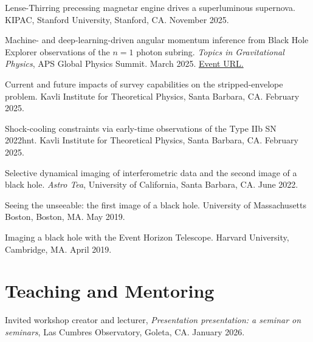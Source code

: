 \documentclass[margin,line]{res}
\begin{document}
\begin{resume}
\vspace*{-2mm}
Lense-Thirring precessing magnetar engine drives a superluminous supernova. KIPAC, Stanford University, Stanford, CA. November 2025.

\vspace*{-2mm}
Machine- and deep-learning-driven angular momentum inference from Black Hole Explorer observations of the $n=1$ photon subring. \textit{Topics in Gravitational Physics}, APS Global Physics Summit. March 2025. {\color{blue}\href{https://summit.aps.org/events/APR-C20/8}{Event URL.}}

\vspace*{-2mm}
Current and future impacts of survey capabilities on the stripped-envelope problem. Kavli Institute for Theoretical Physics, Santa Barbara, CA. February 2025.

\vspace*{-2mm}
Shock-cooling constraints via early-time observations of the Type IIb SN 2022hnt. Kavli Institute for Theoretical Physics, Santa Barbara, CA. February 2025.

\vspace*{-2mm}
Selective dynamical imaging of interferometric data and the second image of a black hole. \textit{Astro Tea}, University of California, Santa Barbara, CA. June 2022.

\vspace*{-2mm}
Seeing the unseeable: the first image of a black hole. University of Massachusetts Boston, Boston, MA. May 2019.

\vspace*{-2mm}
Imaging a black hole with the Event Horizon Telescope. Harvard University, Cambridge, MA. April 2019.






\vspace{+.2cm}
\section{\sc Teaching and Mentoring}

Invited workshop creator and lecturer, \textit{Presentation presentation: a seminar on seminars}, Las Cumbres Observatory, Goleta, CA. January 2026.


\end{resume}
\end{document}
